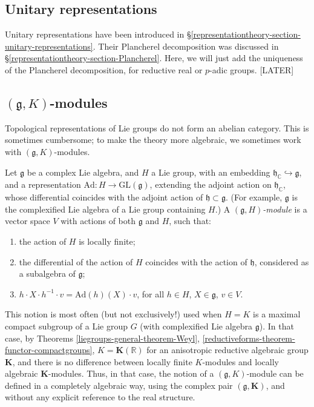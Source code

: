 \subsection{Unitary representations}
\label{subsection-unitary-representations}

Unitary representations have been introduced in \S \ref{representationtheory-section-unitary-representations}. Their Plancherel decomposition was discussed in \S \ref{representationtheory-section-Plancherel}. Here, we will just add the uniqueness of the Plancherel decomposition, for reductive real or $p$-adic groups. [LATER]


\subsection{$(\mathfrak g, K)$-modules}
\label{subsection-gK-modules}

Topological representations of Lie groups do not form an abelian category. This is sometimes cumbersome; to make the theory more algebraic, we sometimes work with $(\mathfrak g,K)$-modules. 

\begin{definition}
 \label{definition-g-K-module}
Let $\mathfrak g$ be a complex Lie algebra, and $H$ a Lie group, with an embedding $\mathfrak h_{\mathbb C}\hookrightarrow \mathfrak g$, and a representation $\text{Ad}:H \to \text{GL}(\mathfrak g)$, extending the adjoint action on $\mathfrak h_{\mathbb C}$, whose differential coincides with the adjoint action of $\mathfrak h\subset\mathfrak g$. (For example, $\mathfrak g$ is the complexified Lie algebra of a Lie group containing $H$.) A {\it $(\mathfrak g, H)$-module} is a vector space $V$ with actions of both $\mathfrak g$ and $H$, such that:
\begin{enumerate}
 \item the action of $H$ is locally finite;
 \item the differential of the action of $H$ coincides with the action of $\mathfrak h$, considered as a subalgebra of $\mathfrak g$;
 \item $h\cdot X\cdot h^{-1}\cdot v = \text{Ad}(h)(X)\cdot v$, for all $h\in H$, $X\in \mathfrak g$, $v\in V$.
\end{enumerate}
\end{definition}

\begin{remark}
 \label{remark-gK-algebraic}
This notion is most often (but not exclusively!) used when $H=K$ is a maximal compact subgroup of a Lie group $G$ (with complexified Lie algebra $\mathfrak g$). In that case, by Theorems \ref{liegroups-general-theorem-Weyl}, \ref{reductiveforms-theorem-functor-compactgroups}, $K=\mathbf K(\mathbb R)$ for an anisotropic reductive algebraic group $\mathbf K$, and there is no difference between locally finite $K$-modules and locally algebraic $\mathbf K$-modules. Thus, in that case, the notion of a $(\mathfrak g, K)$-module can be defined in a completely algebraic way, using the complex pair $(\mathfrak g, \mathbf K)$, and without any explicit reference to the real structure. 
\end{remark}

